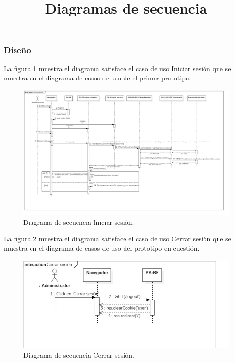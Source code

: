 \subsubsection{Diseño}
\title{\textbf{Diagramas de secuencia \\}}
La figura \ref{PADS:iniciarsesion} muestra el diagrama satisface el caso de uso \hyperlink{casosdeusoPA}{Iniciar sesión} que se muestra en el diagrama de casos de uso de el primer prototipo. \\
\FloatBarrier
\begin{figure}[htbp!]
		\centering
			\includegraphics[width=1.1 \textwidth]{imagenes/DSRuben/PA_iniciarsesion}
		\caption{Diagrama de secuencia Iniciar sesión.}
		\label{PADS:iniciarsesion}
\end{figure}
\FloatBarrier


La figura \ref{PADS:cerrarSesion} muestra el diagrama satisface el caso de uso \hyperlink{casosdeusoPA}{Cerrar sesión} que se muestra en el diagrama de casos de uso del prototipo en cuestión. \\
\FloatBarrier
\begin{figure}[htbp!]
		\centering
			\includegraphics[width=1 \textwidth]{imagenes/DSRuben/PA_cerrarsesion}
		\caption{Diagrama de secuencia Cerrar sesión.}
		\label{PADS:cerrarSesion}
\end{figure}
\FloatBarrier

